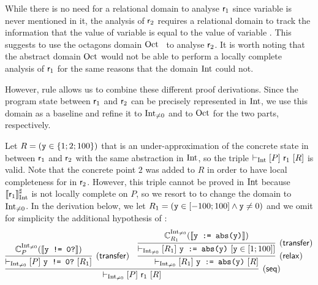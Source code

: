 \begin{example}
	While there is no need for a relational domain to analyse $\mathsf{r}_1$ since  variable  is never mentioned in it,
	the analysis of $\mathsf{r}_2$ requires a relational domain to track the information that the value of variable  is equal to the value of variable .
	This suggests to use the octagons domain $\text{Oct}$~\cite{Mine06} to analyse $\mathsf{r}_2$. It is worth noting that the abstract domain $\text{Oct}$ would not be able to perform a locally complete analysis of $\mathsf{r}_1$ for the same reasons that the domain $\text{Int}$ could not.
	
	However, rule  allows us to combine these different proof derivations. Since the program state between $\mathsf{r}_1$ and $\mathsf{r}_2$ can be precisely represented in $\text{Int}$, we use this domain as a baseline and refine it to $\text{Int}_{\neq 0}$ and to $\text{Oct}$ for the two parts, respectively.
	
	
	Let $R = (\texttt{y} \in \{ 1; 2; 100 \})$ that is an under\hyp{}approximation of the concrete state in between $\mathsf{r}_1$ and $\mathsf{r}_2$ with the same abstraction in $\text{Int}$, so the triple $\vdash_{\text{Int}}\nobreak[P]~\mathsf{r}_1~[R]$ is valid. Note that the concrete point $2$ was added to $R$ in order to have local completeness for  in $\mathsf{r}_2$. However, this triple cannot be proved in $\text{Int}$ because $\llbracket\mathsf{r}_1\rrbracket^{\sharp}_{\text{Int}}$ is not locally complete on $P$, so we resort to  to change the domain to $\text{Int}_{\neq 0}$.
	In the derivation below, we let $R_1 = (\texttt{y} \in [-100; 100] \land \texttt{y} \neq 0)$ and we omit for simplicity the additional hypothesis of :
	\[
	\infer[(\mathsf{seq})]
	{\lcl{\Int_{\neq 0}}{P}{\regr_1}{R}
	}
	{
		\infer[(\mathsf{transfer})]
		{\lcl{\Int_{\neq 0}}{P}{\code{y != 0?}}{R_1}}{ \complete{\Int_{\neq 0}}{P}{\denot{\code{y != 0?}}} }
		&
		\infer[(\mathsf{relax})]
		{\lcl{\Int_{\neq 0}}{R_1}{\code{y := abs(y)}}{R}}
		{\infer[(\mathsf{transfer})]
			{\lcl{\Int_{\neq 0}}{R_1}{\code{y := abs(y)}}{\code{y} \in [1; 100]}}{ \complete{\Int_{\neq 0}}{R_1}{\denot{\code{y := abs(y)}}} }
		}
	}
	\]
	

\end{example}
